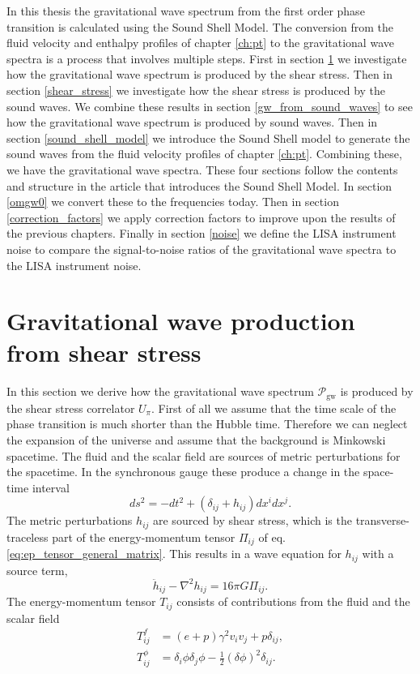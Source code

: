 In this thesis the gravitational wave spectrum from the first order phase transition is calculated using the Sound Shell Model.
The conversion from the fluid velocity and enthalpy profiles of chapter \ref{ch:pt} to the gravitational wave spectra
is a process that involves multiple steps.
First in section \ref{gw_production} we investigate how the gravitational wave spectrum is produced by the shear stress.
Then in section \ref{shear_stress} we investigate how the shear stress is produced by the sound waves.
We combine these results in section \ref{gw_from_sound_waves} to see how the gravitational wave spectrum is produced by sound waves.
Then in section \ref{sound_shell_model} we introduce the Sound Shell model to generate the sound waves from the fluid velocity profiles of chapter \ref{ch:pt}.
Combining these, we have the gravitational wave spectra.
These four sections follow the contents and structure in the article \cite{hindmarsh_gw_pt_2019} that introduces the Sound Shell Model.
In section \ref{omgw0} we convert these to the frequencies today.
Then in section \ref{correction_factors} we apply correction factors to improve upon the results of the previous chapters.
Finally in section \ref{noise} we define the LISA instrument noise to compare the signal-to-noise ratios of the gravitational wave spectra to the LISA instrument noise.


\section{Gravitational wave production from shear stress}
\label{gw_production}
In this section we derive how the gravitational wave spectrum $\mathcal{P}_\text{gw}$ is produced by the shear stress correlator $U_\pi$.
First of all we assume that the time scale of the phase transition is much shorter than the Hubble time.
Therefore we can neglect the expansion of the universe and assume that the background is Minkowski spacetime.
The fluid and the scalar field are sources of metric perturbations for the spacetime.
In the synchronous gauge these produce a change in the space-time interval
\cite[p. 7]{hindmarsh_gw_pt_2019}
\begin{equation}
ds^2 = -dt^2 + (\delta_{ij} + h_{ij}) dx^i dx^j.
\end{equation}
The metric perturbations $h_{ij}$ are sourced by shear stress,
which is the transverse-traceless part of the energy-momentum tensor $\Pi_{ij}$ of eq. \eqref{eq:ep_tensor_general_matrix}.
This results in a wave equation for $h_{ij}$ with a source term,
\cites[eq. 3.1]{hindmarsh_gw_pt_2019}[eq. 1.24]{maggiore_gw_2008}
\begin{equation}
\ddot{h}_{ij} - \nabla^2 h_{ij} = 16 \pi G \Pi_{ij}.
\end{equation}
The energy-momentum tensor $T_{ij}$ consists of contributions from the fluid and the scalar field \cite[p. 7]{hindmarsh_gw_pt_2019}
\begin{align}
T^f_{ij}    &= (e+p) \gamma^2 v_i v_j + p \delta_{ij}, \\
T^\phi_{ij} &= \delta_i \phi \delta_j \phi - \frac{1}{2}(\delta \phi)^2 \delta_{ij}.
\end{align}

